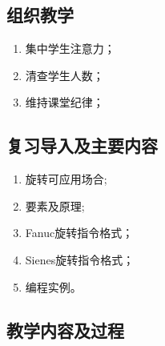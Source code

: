 \jxhj{%
	}
\skrq{%
	}

\makeshouye %

\subsection{组织教学}
\begin{enumerate}[\hspace{2em}1、]
	\item 集中学生注意力；
	\item 清查学生人数；
	\item 维持课堂纪律；
\end{enumerate}
\subsection{复习导入及主要内容}
\begin{enumerate}[1、]
	\item 旋转可应用场合;
	\item 要素及原理;
	\item Fanuc旋转指令格式；
	\item Sienes旋转指令格式；
	\item 编程实例。
\end{enumerate}



\subsection{教学内容及过程}

